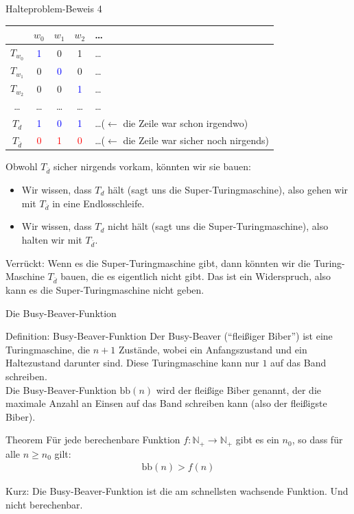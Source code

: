 \begin{frame}{Halteproblem-Beweis 4}
    \begin{table}
        \centering
        \begin{tabular}{ccccl}
            \toprule
                     & $w_0$ & $w_1$ & $w_2$ & \dots\\
             \midrule
             $T_{w_0}$ & \textcolor{blue}{1} & 0 & 1 & \dots\\
             $T_{w_1}$ & 0 & \textcolor{blue}{0} & 0 & \dots\\
             $T_{w_2}$ & 0 & 0 & \textcolor{blue}{1} & \dots\\
             \dots   &  \dots & \dots  & \dots  & \dots \\
             $T_d$ & \textcolor{blue}{1} & \textcolor{blue}{0} & \textcolor{blue}{1} &\dots ($\leftarrow$ die Zeile war schon irgendwo) \\
             $T_{\overline{d}}$ & \textcolor{red}{0} & \textcolor{red}{1} & \textcolor{red}{0} & \dots($\leftarrow$ die Zeile war sicher noch nirgends) \\
             \bottomrule
        \end{tabular}
    \end{table}
    Obwohl $T_{\overline{d}}$ sicher nirgends vorkam, könnten wir sie bauen:
    \begin{itemize}
        \item Wir wissen, dass $T_d$ hält (sagt uns die Super-Turingmaschine), also gehen wir mit $T_{\overline{d}}$ in eine Endlosschleife.
        \item Wir wissen, dass $T_d$ nicht hält (sagt uns die Super-Turingmaschine), also halten wir mit $T_{\overline{d}}$.
    \end{itemize}
    \pause
    Verrückt: Wenn es die Super-Turingmaschine gibt, dann könnten wir die Turing-Maschine $T_{\overline{d}}$ bauen, die es eigentlich nicht gibt. Das ist ein Widerspruch, also kann es die Super-Turingmaschine nicht geben.
\end{frame}
\begin{frame}{Die Busy-Beaver-Funktion}
    \begin{block}{Definition: Busy-Beaver-Funktion}
        Der Busy-Beaver (``fleißiger Biber'') ist eine Turingmaschine, die $n+1$ Zustände, wobei ein Anfangszustand und ein Haltezustand darunter sind. Diese Turingmaschine kann nur $1$ auf das Band schreiben.\\
        Die Busy-Beaver-Funktion $\mathrm{bb}\left( n \right)$ wird der fleißige Biber genannt, der die maximale Anzahl an Einsen auf das Band schreiben kann (also der fleißigste Biber).
    \end{block}
    \pause
    \begin{block}{Theorem}
        Für jede berechenbare Funktion $f: \mathbb{N}_+ \rightarrow \mathbb{N}_+$ gibt es ein $n_0$, so dass für alle $n \geq n_0$ gilt:
        \begin{align*}
            \mathrm{bb}\left( n \right) > f(n)
        \end{align*}
    \end{block}
    Kurz: Die Busy-Beaver-Funktion ist die am schnellsten wachsende Funktion. Und nicht berechenbar.
\end{frame}
